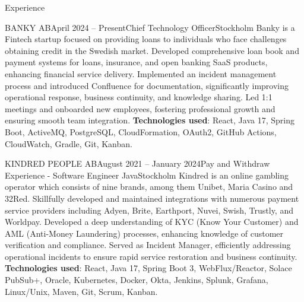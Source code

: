 \documentclass{resume}
\begin{document}
  \begin{rSection}{Experience}
    \begin{rSubsection}{BANKY AB}{April 2024 -- Present}{Chief Technology Officer}{Stockholm}
      \bItem Banky is a Fintech startup focused on providing loans to individuals who face challenges obtaining credit in the Swedish market.
      \bItem Developed comprehensive loan book and payment systems for loans, insurance, and open banking SaaS products, enhancing financial service delivery.
      \bItem Implemented an incident management process and introduced Confluence for documentation, significantly improving operational response, business continuity, and knowledge sharing.
      \bItem Led 1:1 meetings and onboarded new employees, fostering professional growth and ensuring smooth team integration.
      \bItem \textbf{Technologies used}: React, Java 17, Spring Boot, ActiveMQ, PostgreSQL, CloudFormation, OAuth2, GitHub Actions, CloudWatch, Gradle, Git, Kanban.
    \end{rSubsection}

    \begin{rSubsection}{KINDRED PEOPLE AB}{August 2021 -- January 2024}{Pay and Withdraw Experience - Software Engineer Java}{Stockholm}
      \bItem Kindred is an online gambling operator which consists of nine brands, among them Unibet, Maria Casino and 32Red.
      \bItem Skillfully developed and maintained integrations with numerous payment service providers including Adyen, Brite, Earthport, Nuvei, Swish, Trustly, and Worldpay.
      \bItem Developed a deep understanding of KYC (Know Your Customer) and AML (Anti-Money Laundering) processes, enhancing knowledge of customer verification and compliance.
      \bItem Served as Incident Manager, efficiently addressing operational incidents to ensure rapid service restoration and business continuity.
      \bItem \textbf{Technologies used}: React, Java 17, Spring Boot 3, WebFlux/Reactor, Solace PubSub+, Oracle, Kubernetes, Docker, Okta, Jenkins, Splunk, Grafana, Linux/Unix, Maven, Git, Scrum, Kanban.
    \end{rSubsection}


\end{rSection}
\end{document}
